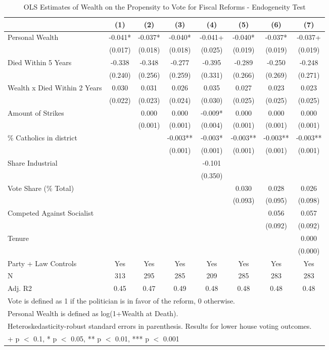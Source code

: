 \begin{table}

\caption{\label{tab:harnas5}OLS Estimates of Wealth on the Propensity to Vote for Fiscal Reforms - Endogeneity Test}
\centering
\begin{tabular}[t]{lccccccc}
\toprule
  & (1) & (2) & (3) & (4) & (5) & (6) & (7)\\
\midrule
Personal Wealth & -0.041* & -0.037* & -0.040* & -0.041+ & -0.040* & -0.037* & -0.037+\\
 & (0.017) & (0.018) & (0.018) & (0.025) & (0.019) & (0.019) & (0.019)\\
Died Within 5 Years & -0.338 & -0.348 & -0.277 & -0.395 & -0.289 & -0.250 & -0.248\\
 & (0.240) & (0.256) & (0.259) & (0.331) & (0.266) & (0.269) & (0.271)\\
Wealth x Died Within 2 Years & 0.030 & 0.031 & 0.026 & 0.035 & 0.027 & 0.023 & 0.023\\
 & (0.022) & (0.023) & (0.024) & (0.030) & (0.025) & (0.025) & (0.025)\\
Amount of Strikes &  & 0.000 & 0.000 & -0.009* & 0.000 & 0.000 & 0.000\\
 &  & (0.001) & (0.001) & (0.004) & (0.001) & (0.001) & (0.001)\\
\% Catholics in district &  &  & -0.003** & -0.003* & -0.003** & -0.003** & -0.003**\\
 &  &  & (0.001) & (0.001) & (0.001) & (0.001) & (0.001)\\
Share Industrial &  &  &  & -0.101 &  &  & \\
 &  &  &  & (0.350) &  &  & \\
Vote Share (\% Total) &  &  &  &  & 0.030 & 0.028 & 0.026\\
 &  &  &  &  & (0.093) & (0.095) & (0.098)\\
Competed Against Socialist &  &  &  &  &  & 0.056 & 0.057\\
 &  &  &  &  &  & (0.092) & (0.092)\\
Tenure &  &  &  &  &  &  & 0.000\\
 &  &  &  &  &  &  & (0.000)\\
\midrule
Party + Law Controls & Yes & Yes & Yes & Yes & Yes & Yes & Yes\\
N & 313 & 295 & 285 & 209 & 285 & 283 & 283\\
Adj. R2 & 0.45 & 0.47 & 0.49 & 0.48 & 0.48 & 0.48 & 0.48\\
\bottomrule
\multicolumn{8}{l}{\rule{0pt}{1em}Vote is defined as 1 if the politician is in favor of the reform, 0 otherwise.}\\
\multicolumn{8}{l}{\rule{0pt}{1em}Personal Wealth is defined as log(1+Wealth at Death).}\\
\multicolumn{8}{l}{\rule{0pt}{1em}Heteroskedasticity-robust standard errors in parenthesis. Results for lower house voting outcomes.}\\
\multicolumn{8}{l}{\rule{0pt}{1em}+ p $<$ 0.1, * p $<$ 0.05, ** p $<$ 0.01, *** p $<$ 0.001}\\
\end{tabular}
\end{table}
